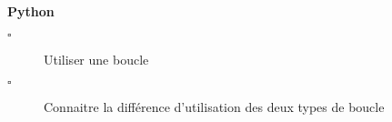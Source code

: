 \begin{titre}

\end{titre}


\begin{CpsCol}
\textbf{Python}
\begin{description}
\item[$\square$] Utiliser une boucle
\item[$\square$] Connaitre la différence d'utilisation des deux types de boucle
\end{description}
\end{CpsCol}


\begin{PC}

\end{PC}

